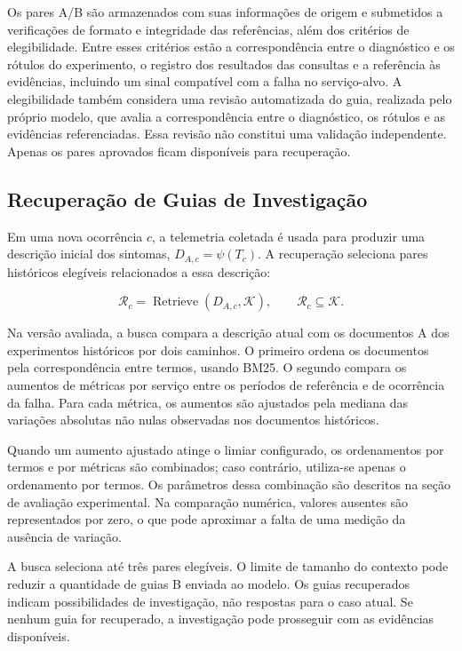 \documentclass[12pt]{article}
\begin{document}
Os pares A/B são armazenados com suas informações de origem e submetidos a
verificações de formato e integridade das referências, além dos critérios de
elegibilidade. Entre esses critérios estão a correspondência entre o
diagnóstico e os rótulos do experimento, o registro dos resultados das
consultas e a referência às evidências, incluindo um sinal compatível com a
falha no serviço-alvo. A elegibilidade também considera uma revisão
automatizada do guia, realizada pelo próprio modelo, que avalia a
correspondência entre o diagnóstico, os rótulos e as evidências
referenciadas. Essa revisão não constitui uma validação independente.
Apenas os pares aprovados ficam disponíveis para recuperação.

\subsection{Recuperação de Guias de Investigação}
\label{sec:recuperacao}

Em uma nova ocorrência $c$, a telemetria coletada é usada para produzir uma
descrição inicial dos sintomas, $D_{A,c}=\psi(T_c)$. A recuperação seleciona
pares históricos elegíveis relacionados a essa descrição:

\begin{equation}
  \mathcal{R}_c =
  \operatorname{Retrieve}(D_{A,c},\mathcal{K}),
  \qquad \mathcal{R}_c\subseteq\mathcal{K}.
\end{equation}

Na versão avaliada, a busca compara a descrição atual com os documentos A dos
experimentos históricos por dois caminhos. O primeiro ordena os documentos
pela correspondência entre termos, usando BM25. O segundo compara os aumentos
de métricas por serviço entre os períodos de referência e de ocorrência da
falha. Para cada métrica, os aumentos são ajustados pela mediana das
variações absolutas não nulas observadas nos documentos históricos.

Quando um aumento ajustado atinge o limiar configurado, os ordenamentos por
termos e por métricas são combinados; caso contrário, utiliza-se apenas o
ordenamento por termos. Os parâmetros dessa combinação são descritos na
seção de avaliação experimental. Na comparação numérica, valores ausentes
são representados por zero, o que pode aproximar a falta de uma medição da
ausência de variação.

A busca seleciona até três pares elegíveis. O limite de tamanho do contexto
pode reduzir a quantidade de guias B enviada ao modelo. Os guias recuperados
indicam possibilidades de investigação, não respostas para o caso atual.
Se nenhum guia for recuperado, a investigação pode prosseguir com as
evidências disponíveis.
\end{document}
